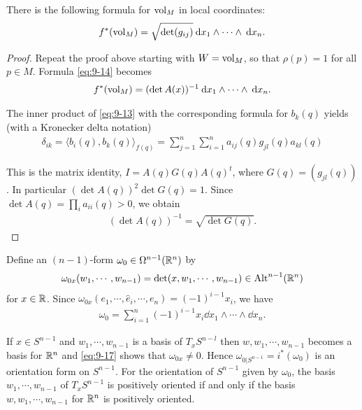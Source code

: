 \begin{addendum}\label{addendum:9-17}
  There is the following formula for $\mathrm{vol}_M$ in local coordinates:
  \begin{align}\label{eq:9-15}
    f^*(\R{vol}_M) = \sqrt{\det (g_{ij})} \dd x_1\wedge\cdots\wedge\dd x_n.
  \end{align}
\end{addendum}

\begin{proof}
  Repeat the proof above starting with $W = \mathrm{vol}_M$, so that $\rho(p) = 1$ for all
$p\in M$. Formula \eqref{eq:9-14} becomes
\begin{align}\label{eq:9-16}
  f^*(\R{vol}_M) = (\det A(x))^{-1}\dd x_1\wedge\cdots\wedge\dd x_n.
\end{align}

The inner product of \eqref{eq:9-13} with the corresponding formula for $b_k(q)$ yields (with
a Kronecker delta notation)
\begin{align*}
  \delta_{ik} = \langle b_i(q), b_k(q) \rangle_{f(q)} 
    = \sum_{j=1}^{n}{\sum_{i=1}^{n}{a_{ij}(q)g_{jl}(q)a_{kl}(q)}}
\end{align*}

This is the matrix identity, $I = A(q) G(q) A(q)^t$, where $G(q) = (g_{jl}(q))$. In
particular $(\det A(q))^2 \det G(q) = 1$. Since $\det A(q) = \prod_i a_{ii}(q)>0$, we 
obtain
\begin{align*}
  (\det A(q))^{-1} = \sqrt{\det G(q)}.
\end{align*}
\end{proof}

\begin{example}\label{example:9-18}
  Define an $(n - 1)$-form $\omega_0\in \Omega^{n-1}(\mathbb{R}^n)$ by
  \begin{align}\label{eq:9-17}
    \omega_{0x}(w_1, \cdots, w_{n-1})
    = \det (x, w_1, \cdots, w_{n-1})\in \operatorname{Alt}^{n-1}(\mathbb{R}^n) 
  \end{align}
  for $x\in\mathbb{R}$. Since $\omega_{0x}(e_1, \cdots, \hat{e}_i, \cdots, e_n) = (-1)^{i-1}x_i$, we have 
  \begin{align}\label{eq:9-18}
    \omega_0 = \sum_{i=1}^{n }{(-1)^{i-1} x_i \dd x_1\wedge\cdots\wedge\dd x_n}.
  \end{align}

  If $x\in S^{n-1}$ and $w_1, \cdots, w_{n-1}$ is a basis of $T_xS^{n-l}$ then $w, w_1, \cdots, w_{n-1}$
  becomes a basis for $\mathbb{R}^n$ and \eqref{eq:9-17} shows that $\omega_{0x}\neq 0$. Hence $\omega_{0|S^{n-1}} = i^*(\omega_0)$
  is an orientation form on $S^{n-1}$. For the orientation of $S^{n-1}$ given by $\omega_0$, the
  basis $w_1, \cdots, w_{n-1}$ of $T_xS^{n-1}$ is positively oriented if and only if the basis
  $w, w_1, \cdots, w_{n-1}$ for $\mathbb{R}^n$ is positively oriented.
\end{example}

